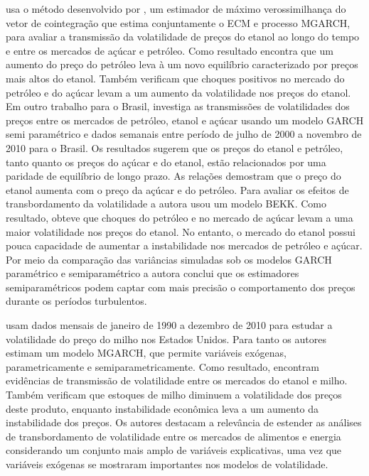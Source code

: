 	
	  usa o método desenvolvido por , um estimador de máximo verossimilhança do vetor de cointegração que estima conjuntamente o ECM e 	processo MGARCH, para avaliar a transmissão da volatilidade de preços do etanol ao longo do tempo e entre os mercados de açúcar e petróleo. Como resultado encontra que um aumento do preço do petróleo leva à  um novo equilíbrio caracterizado por preços mais altos do etanol.  Também verificam que choques positivos no mercado do petróleo e do açúcar levam a um aumento da volatilidade nos preços do etanol.  Em outro trabalho para o Brasil,  investiga as transmissões de volatilidades dos preços entre os mercados de petróleo, etanol e açúcar  usando um modelo GARCH semi paramétrico e dados semanais entre período de julho de 2000 a novembro de 2010 para o Brasil. Os resultados sugerem que os preços do etanol e petróleo, tanto quanto os preços do açúcar e do etanol, estão relacionados por uma paridade de equilíbrio de longo prazo. As relações demostram que o preço do etanol aumenta com o preço da açúcar e do petróleo. Para avaliar os efeitos de transbordamento da volatilidade a autora usou um modelo BEKK. Como resultado, obteve que choques do petróleo e no mercado de açúcar levam a uma maior volatilidade nos preços do etanol. No entanto, o mercado do etanol possui pouca capacidade de aumentar a instabilidade nos mercados de petróleo e açúcar. Por meio da comparação  das variâncias simuladas sob os modelos  GARCH paramétrico e semiparamétrico a autora conclui que os estimadores  semiparamétricos podem captar com mais precisão o comportamento dos preços durante os períodos turbulentos.
	
	 usam dados mensais de janeiro de 1990 a dezembro de 2010 para estudar a volatilidade do preço do milho nos Estados Unidos. Para tanto os autores estimam um modelo MGARCH, que permite variáveis exógenas,  parametricamente e semiparametricamente. Como resultado, encontram evidências de transmissão de volatilidade entre os mercados do etanol e milho. Também verificam que estoques de milho diminuem a volatilidade dos preços deste produto, enquanto instabilidade econômica leva a um aumento da instabilidade dos preços. Os autores destacam a relevância de estender as análises de transbordamento de volatilidade entre os mercados de alimentos e energia considerando um conjunto mais amplo de variáveis explicativas, uma vez que  variáveis exógenas se mostraram importantes nos modelos de volatilidade.
	
